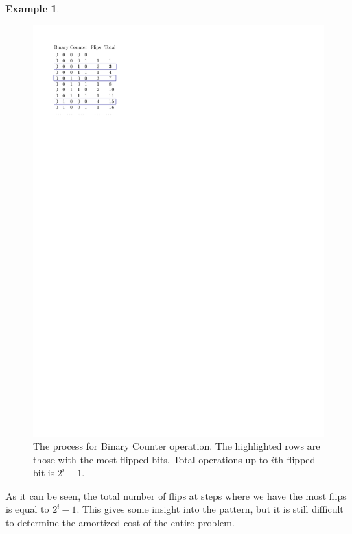 \documentclass[11pt]{article}
\theoremstyle{definition}
\newtheorem{exmp}{Example}[section]
\begin{document}
\begin{exmp}
\begin{figure}[tbh]
\centering
\includegraphics[scale=1]{aggregate.pdf}
\caption{The process for Binary Counter operation.  The highlighted rows are those with  the most flipped bits. Total operations up to $i$th flipped bit is $2^i-1$.}
\label{fig:aggregate}
\end{figure}

As it can be seen, the total number of flips at steps where we have the most flips is equal to $2^i-1$. This gives some insight into the pattern, but it is still difficult to determine the amortized cost of the entire problem.


\end{exmp}
\end{document}
